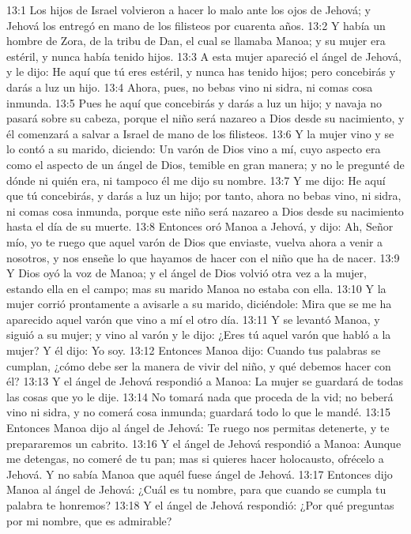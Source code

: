 13:1 Los hijos de Israel volvieron a hacer lo malo ante los ojos de Jehová; y Jehová los entregó en mano de los filisteos por cuarenta años.  
13:2 Y había un hombre de Zora, de la tribu de Dan, el cual se llamaba Manoa; y su mujer era estéril, y nunca había tenido hijos.  
13:3 A esta mujer apareció el ángel de Jehová, y le dijo: He aquí que tú eres estéril, y nunca has tenido hijos; pero concebirás y darás a luz un hijo.  
13:4 Ahora, pues, no bebas vino ni sidra, ni comas cosa inmunda.  
13:5 Pues he aquí que concebirás y darás a luz un hijo; y navaja no pasará sobre su cabeza, porque el niño será nazareo a Dios desde su nacimiento, y él comenzará a salvar a Israel de mano de los filisteos.  
13:6 Y la mujer vino y se lo contó a su marido, diciendo: Un varón de Dios vino a mí, cuyo aspecto era como el aspecto de un ángel de Dios, temible en gran manera; y no le pregunté de dónde ni quién era, ni tampoco él me dijo su nombre.  
13:7 Y me dijo: He aquí que tú concebirás, y darás a luz un hijo; por tanto, ahora no bebas vino, ni sidra, ni comas cosa inmunda, porque este niño será nazareo a Dios desde su nacimiento hasta el día de su muerte.  
13:8 Entonces oró Manoa a Jehová, y dijo: Ah, Señor mío, yo te ruego que aquel varón de Dios que enviaste, vuelva ahora a venir a nosotros, y nos enseñe lo que hayamos de hacer con el niño que ha de nacer.  
13:9 Y Dios oyó la voz de Manoa; y el ángel de Dios volvió otra vez a la mujer, estando ella en el campo; mas su marido Manoa no estaba con ella.  
13:10 Y la mujer corrió prontamente a avisarle a su marido, diciéndole: Mira que se me ha aparecido aquel varón que vino a mí el otro día.  
13:11 Y se levantó Manoa, y siguió a su mujer; y vino al varón y le dijo: ¿Eres tú aquel varón que habló a la mujer? Y él dijo: Yo soy.  
13:12 Entonces Manoa dijo: Cuando tus palabras se cumplan, ¿cómo debe ser la manera de vivir del niño, y qué debemos hacer con él?  
13:13 Y el ángel de Jehová respondió a Manoa: La mujer se guardará de todas las cosas que yo le dije.  
13:14 No tomará nada que proceda de la vid; no beberá vino ni sidra, y no comerá cosa inmunda; guardará todo lo que le mandé.  
13:15 Entonces Manoa dijo al ángel de Jehová: Te ruego nos permitas detenerte, y te prepararemos un cabrito.  
13:16 Y el ángel de Jehová respondió a Manoa: Aunque me detengas, no comeré de tu pan; mas si quieres hacer holocausto, ofrécelo a Jehová. Y no sabía Manoa que aquél fuese ángel de Jehová.  
13:17 Entonces dijo Manoa al ángel de Jehová: ¿Cuál es tu nombre, para que cuando se cumpla tu palabra te honremos?  
13:18 Y el ángel de Jehová respondió: ¿Por qué preguntas por mi nombre, que es admirable?  
